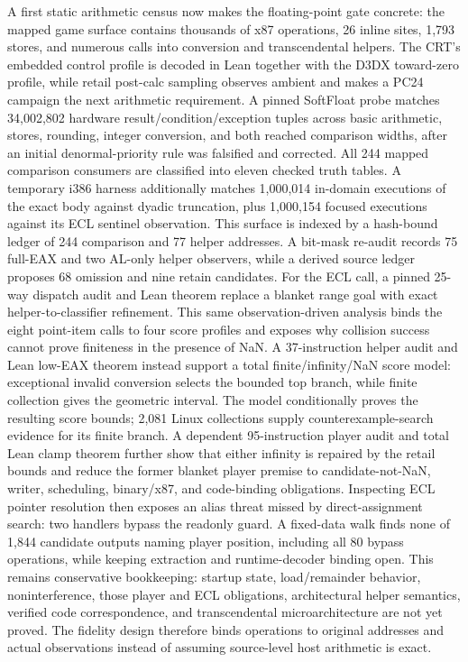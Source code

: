 A first static arithmetic census now makes the floating-point gate concrete:
the mapped game surface contains thousands of x87 operations, 26 inline
 sites, 1,793 stores, and numerous calls into conversion and
transcendental helpers.  The CRT's embedded  control profile is
decoded in Lean together with the D3DX toward-zero profile, while retail
post-calc sampling observes ambient  and makes a PC24 campaign the
next arithmetic requirement.  A pinned SoftFloat probe
matches 34,002,802 hardware result/condition/exception tuples across basic
arithmetic, stores, rounding, integer conversion, and both reached comparison
widths, after an initial denormal-priority rule was falsified and corrected.
All 244 mapped comparison consumers are classified into eleven checked truth
tables.  A temporary i386 harness additionally matches 1,000,014 in-domain
executions of the exact  body against dyadic truncation, plus
1,000,154 focused executions against its ECL sentinel observation.  This
surface is indexed by a hash-bound ledger of 244 comparison and 77 helper
addresses.  A bit-mask re-audit records 75 full-EAX and two AL-only helper
observers, while a derived source ledger proposes 68 omission and nine retain
candidates.  For the ECL call, a pinned 25-way dispatch audit and Lean theorem
replace a blanket range goal with exact helper-to-classifier refinement.  This
same observation-driven analysis binds the eight point-item calls to four
score profiles and exposes why collision success cannot prove finiteness in
the presence of NaN.  A 37-instruction helper audit and Lean low-EAX theorem
instead support a total finite/infinity/NaN score model: exceptional invalid
conversion selects the bounded top branch, while finite collection gives the
geometric interval.  The model conditionally proves the resulting score
bounds; 2,081 Linux collections supply counterexample-search evidence for its
finite branch.  A dependent 95-instruction player audit and total Lean clamp
theorem further show that either infinity is repaired by the retail bounds and
reduce the former blanket player premise to candidate-not-NaN, writer,
scheduling, binary/x87, and code-binding obligations.  Inspecting ECL pointer
resolution then exposes an alias threat missed by direct-assignment search: two
handlers bypass the readonly guard.  A fixed-data walk finds none of 1,844
candidate outputs naming player position, including all 80 bypass operations,
while keeping extraction and runtime-decoder binding open.  This remains
conservative bookkeeping: startup state, load/remainder behavior,
noninterference, those player and ECL obligations, architectural helper
semantics, verified code correspondence, and
transcendental microarchitecture are not yet proved.  The
fidelity design therefore binds operations to original addresses and actual
observations instead of assuming source-level host arithmetic is exact.

